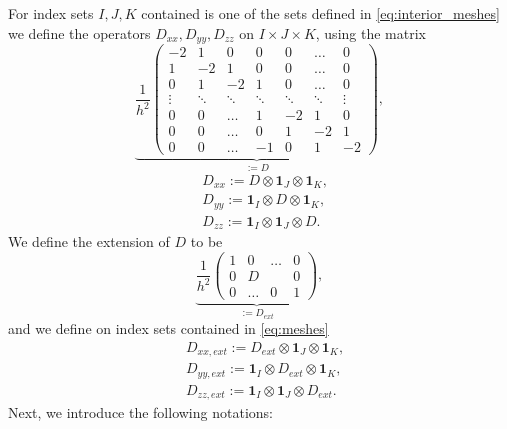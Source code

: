 \documentclass[12pt,reqno]{amsart}
\theoremstyle{definition}
\numberwithin{equation}{section}
\begin{document}
For  index sets $I,J,K$  contained is one of the sets defined in \eqref{eq:interior_meshes}
 we define the operators $D_{xx},D_{yy},D_{zz}$ on $I\times J\times K$, using the matrix 
$$
	\underbrace{
	\frac{1}{h^2}
	\begin{pmatrix}
		-2     & 1     & 0      & 0     & 0      & \dots  & 0      \\
		1     & -2     & 1      & 0      & 0      & \dots  & 0      \\
		0      & 1      & -2     & 1      & 0      & \dots  & 0      \\
		\vdots & \ddots & \ddots & \ddots & \ddots & \ddots & \vdots \\
		0      & 0      & \dots  & 1      & -2     & 1      & 0      \\
		0      & 0      & \dots  & 0      & 1      & -2    & 1      \\
		0      & 0      & \dots  & -1     & 0      & 1     & -2
\end{pmatrix}}_{:=D},
$$
\begin{align*}
	&
	D_{xx}:=D\otimes \mathbf{1}_J\otimes \mathbf{1}_K,\\&
D_{yy}:= \mathbf{1}_I\otimes D\otimes \mathbf{1}_K, \\&
D_{zz}:= \mathbf{1}_I\otimes \mathbf{1}_J\otimes D.
\end{align*}
We define the extension of $D$ to be 
$$
\underbrace{
	\frac{1}{h^2}
	\begin{pmatrix}
		1     & 0&\dots& 0  \\
		0&D &&0\\
		0&\dots&0&1
		\end{pmatrix}}_{:=D_{ext}},
$$
and we define on index sets contained in \eqref{eq:meshes}
\begin{align}\label{eq:ext}
	&
	D_{xx,ext}:=D_{ext}\otimes \mathbf{1}_J\otimes \mathbf{1}_K,\\& \nonumber
D_{yy,ext}:= \mathbf{1}_I\otimes D_{ext}\otimes \mathbf{1}_K, \\& \nonumber
D_{zz,ext}:= \mathbf{1}_I\otimes \mathbf{1}_J\otimes D_{ext}. \nonumber
\end{align}
   Next, we introduce the following notations:
\end{document}
